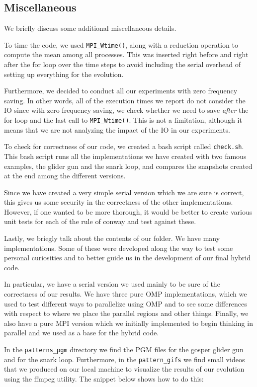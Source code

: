 \documentclass{report}
\begin{document}
\subsection{Miscellaneous}

We briefly discuss some additional miscellaneous details. 

To time the code, we used \texttt{MPI\_Wtime()}, along with a reduction 
operation to compute the mean among all processes. This was inserted right 
before and right after the for loop over the time steps to avoid including the 
serial overhead of setting up everything for the evolution.  

Furthermore, we decided to conduct all our experiments with zero frequency saving. 
In other words, all of the execution times we report do not consider the IO since 
with zero frequency saving, we check whether we need to save \textit{after} the
for loop and the last call to \texttt{MPI\_Wtime()}. This is not a limitation, 
although it means that we are not analyzing the impact of the IO in our experiments.

To check for correctness of our code, we created a bash script called 
\texttt{check.sh}. This bash script runs all the implementations we have created 
with two famous examples, the glider gun and the snark loop, and compares the 
snapshots created at the end among the different versions. 

Since we have created a very simple serial version which we are sure is correct, 
this gives us some security in the correctness of the other implementations. 
However, if one wanted to be more thorough, it would be better to create various 
unit tests for each of the rule of conway and test against these.

Lastly, we briegly talk about the contents of our folder. We have many implementations.
Some of these were developed along the way to test some personal curiosities and 
to better guide us in the development of our final hybrid code. 

In particular, we have a serial version we used mainly to be sure of the correctness 
of our results. We have three pure OMP implementations, which we used to test 
different ways to parallelize using OMP and to see some differences with respect 
to where we place the parallel regions and other things. Finally, we also have a 
pure MPI version which we initially implemented to begin thinking in parallel and 
we used as a base for the hybrid code. 

In the \texttt{patterns\_pgm} directory we find the PGM files for the gosper glider gun and 
for the snark loop. Furthermore, in the \texttt{pattern\_gifs} we find small videos 
that we produced on our local machine to visualize the results of our evolution 
using the ffmpeg utility. The snippet below shows how to do this: 
\end{document}
